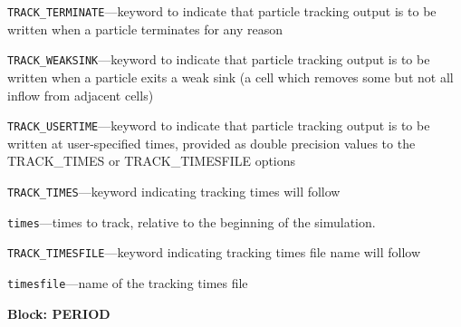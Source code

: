 \begin{description}
\item \texttt{TRACK\_TERMINATE}---keyword to indicate that particle tracking output is to be written when a particle terminates for any reason

\item \texttt{TRACK\_WEAKSINK}---keyword to indicate that particle tracking output is to be written when a particle exits a weak sink (a cell which removes some but not all inflow from adjacent cells)

\item \texttt{TRACK\_USERTIME}---keyword to indicate that particle tracking output is to be written at user-specified times, provided as double precision values to the TRACK\_TIMES or TRACK\_TIMESFILE options

\item \texttt{TRACK\_TIMES}---keyword indicating tracking times will follow

\item \texttt{times}---times to track, relative to the beginning of the simulation.

\item \texttt{TRACK\_TIMESFILE}---keyword indicating tracking times file name will follow

\item \texttt{timesfile}---name of the tracking times file

\end{description}
\item \textbf{Block: PERIOD}

